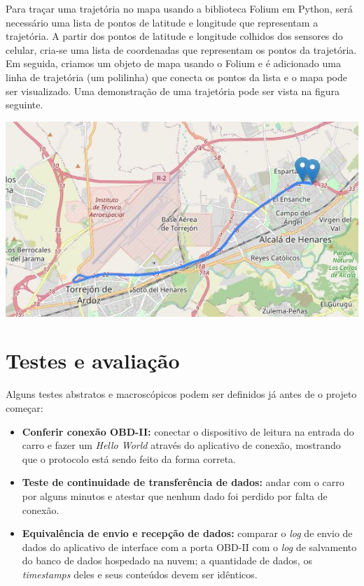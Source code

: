 {Para traçar uma trajetória no mapa usando a biblioteca Folium em Python, será necessário uma lista de pontos de latitude e longitude que representam a trajetória. A partir dos pontos de latitude e longitude colhidos dos sensores do celular, cria-se uma lista de coordenadas que representam os pontos da trajetória. Em seguida, criamos um objeto de mapa usando o Folium e é adicionado uma linha de trajetória (um polilinha) que conecta os pontos da lista e o mapa pode ser visualizado. Uma demonstração de uma trajetória pode ser vista na figura seguinte.

\begin{center}
         \includegraphics[scale=0.8]         {figures/rota1.JPG}
         \end{center}




\section{Testes e avaliação}
Alguns testes abstratos e macroscópicos podem ser definidos já antes de o projeto começar:

\begin{itemize}
    \item \textbf{Conferir conexão OBD-II:} conectar o dispositivo de leitura na entrada do carro e fazer um \textit{Hello World} através do aplicativo de conexão, mostrando que o protocolo está sendo feito da forma correta.
    
    \item \textbf{Teste de continuidade de transferência de dados:} andar com o carro por alguns minutos e atestar que nenhum dado foi perdido por falta de conexão.
    
    \item \textbf{Equivalência de envio e recepção de dados:} comparar o \textit{log} de envio de dados do aplicativo de interface com a porta OBD-II com o \textit{log} de salvamento do banco de dados hospedado na nuvem; a quantidade de dados, os \textit{timestamps} deles e seus conteúdos devem ser idênticos. 
    

\end{itemize}}

